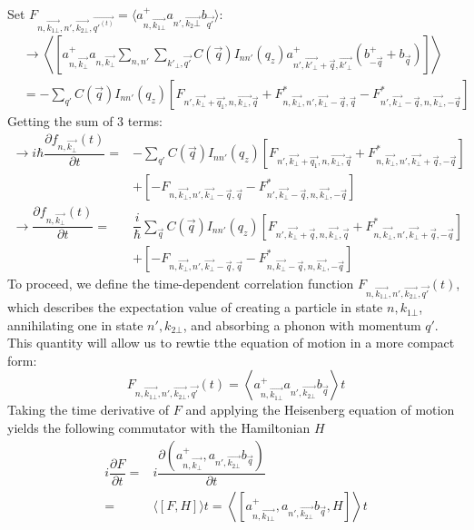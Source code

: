 \documentclass{article}
\begin{document}
Set $F_{n,\vec{k_{1\bot}},n', \vec{k_{2\bot}},\vec{q'^{(t)}}} = \langle a^+_{n, \vec{k_{1\bot}}}a_{n',\vec{k_2\bot}} b_{\vec{q'}}\rangle$:
\begin{align*}
    & \rightarrow \left\langle \left[a^+_{n, \vec{k_\bot}}a_{n,\vec{k_\bot}} \sum_{n,n'}\sum_{k'_\bot,\vec{q'}}C\left(\vec{q}\right)I_{nn'}\left(q_z\right)a^+_{n', \vec{k'_\bot}+\vec{q},\vec{k'_\bot}}\left(b^+_{-\vec{q}}+b_{\vec{q}}\right)\right]\right\rangle\\ 
    & = -\sum_{q'} C\left(\vec{q}\right)I_{nn'}\left(q_z\right) \left[F_{n',\vec{k_\bot}+\vec{q_1},n,\vec{k_\bot,}\vec{q}}+F^*_{n,\vec{k_\bot},n',\vec{k_\bot}-\vec{q},\vec{q}}-F^*_{n',\vec{k_\bot}-\vec{q},n,\vec{k_\bot},-\vec{q}}\right]
\end{align*}
Getting the sum of 3 terms:
\begin{align*}
    \rightarrow i\hbar\dfrac{\partial f_{n, \vec{k_\bot}}\left(t\right)}{\partial t} = & -\sum_{q'} C\left(\vec{q}\right)I_{nn'}\left(q_z\right) \left[F_{n',\vec{k_\bot}+\vec{q_1},n,\vec{k_\bot,}\vec{q}}+F^*_{n,\vec{k_\bot},n',\vec{k_\bot}+\vec{q},-\vec{q}}\right]\\
    & + \left[-F_{n,\vec{k_\bot},n',\vec{k_\bot}-\vec{q},\vec{q}}-F^*_{n',\vec{k_\bot}-\vec{q},n,\vec{k_\bot},-\vec{q}}\right]\\
    \rightarrow \dfrac{\partial f_{n, \vec{k_\bot}}(t)}{\partial t} = & \dfrac{i}{\hbar} \sum_{\vec{q}} C\left(\vec{q}\right) I_{nn'} \left(q_z \right) \left[ F_{n', \vec{k_\bot}+\vec{q},n,\vec{k_\bot},\vec{q}}+ F^*_{n,
    \vec{k_\bot},n',\vec{k_\bot}+\vec{q},-\vec{q}}\right] \\
    & + \left[-F_{n,\vec{k_\bot},n', \vec{k_\bot}-\vec{q}, \vec{q}}- F^*_{n, \vec{k_\bot}-\vec{q}, n, \vec{k_\bot},-\vec{q}}\right]
\end{align*}
To proceed, we define the time-dependent correlation function $F_{n, \vec{k_{1\bot}}, n',\vec{k_{2\bot}},\vec{q'}}(t)$, which describes the expectation value of creating a particle in state $n,k_{1\bot}$, annihilating one in state $n', k_{2\bot}$, and absorbing a phonon with momentum $q'$. This quantity will allow us to rewtie tthe equation of motion in a more compact form:  $$F_{n, \vec{k_{1\bot}}, n',\vec{k_{2\bot}},\vec{q'}}(t)= \left\langle a^+_{n,\vec{k_{1\bot}}}a_{n', \vec{k_{2\bot}}}b_{\vec{q}} \right \rangle t$$ 
Taking the time derivative of $F$ and applying the Heisenberg equation of motion yields the following commutator with the Hamiltonian $H$
\begin{align*}
    i \dfrac{\partial F}{\partial t} = &i \dfrac{\partial \left(a^+_{n, \vec{k_\bot}}, a_{n', \vec{k_{2\bot}}}b_{\vec{q}}\right)}{\partial t}\\
    = & \langle [F,H] \rangle t= \left\langle\left[a^+_{n,\vec{k_{1\bot}}},a_{n', \vec{k_{2\bot}}}b_{\vec{q}},H\right] \right\rangle t
\end{align*}
\end{document}

